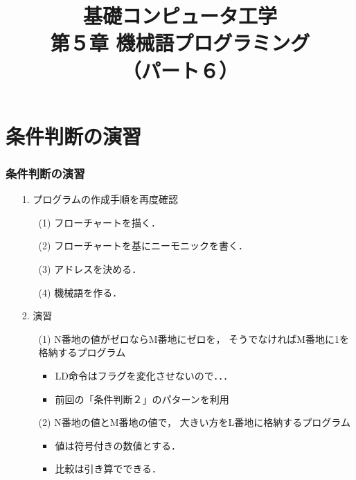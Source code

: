 \documentclass{beamer}                 %
\begin{document}
\title{基礎コンピュータ工学\\第５章 機械語プログラミング\\（パート６）}
\date{}

\begin{frame}
  \titlepage
\end{frame}


\section{条件判断の演習}
\begin{frame}
  \frametitle{条件判断の演習}
  \begin{enumerate}
  \item[1.] プログラムの作成手順を再度確認
    \begin{enumerate}
    \item[(1)] フローチャートを描く．
    \item[(2)] フローチャートを基にニーモニックを書く．
    \item[(3)] アドレスを決める．
    \item[(4)] 機械語を作る．
    \end{enumerate}
    \vfill
  \item[2.] 演習
    \begin{enumerate}
    \item[(1)] N番地の値がゼロならM番地にゼロを，
      そうでなければM番地に1を格納するプログラム
      \begin{itemize}
      \item LD命令はフラグを変化させないので．．．
      \item 前回の「条件判断２」のパターンを利用
      \end{itemize}
      \vfill
    \item[(2)] N番地の値とM番地の値で，
      大きい方をL番地に格納するプログラム
      \begin{itemize}
      \item 値は符号付きの数値とする．
      \item 比較は引き算でできる．
      \end{itemize}
    \end{enumerate}
  \end{enumerate}
  \vfill
\end{frame}
\end{document}
